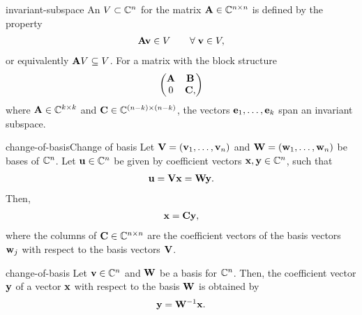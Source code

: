 \begin{Definition}{invariant-subspace}
  An  $V\subset\mathbb C^n$ for the matrix
  $\mathbf A\in\mathbb C^{n\times n}$ is defined by the property
  \begin{gather}
    \mathbf A\mathbf v \in V \qquad \forall\;\mathbf v\in V,
  \end{gather}
  or equivalently $\mathbf A V \subseteq V$.
  For a matrix with the block structure
  \begin{gather}
    \begin{pmatrix}
      \mathbf A & \mathbf B\\ 0 & \mathbf C,
    \end{pmatrix}
  \end{gather}
  where $\mathbf A\in\mathbb C^{k\times k}$ and $\mathbf C\in\mathbb C^{(n-k)\times (n-k)}$,
  the vectors $\mathbf e_{1},\dots,\mathbf e_{k}$ span an invariant subspace.
\end{Definition}

\begin{Lemma*}{change-of-basis}{Change of basis}
  Let $\mathbf V = (\mathbf v_1,\dots, \mathbf v_n)$ and $\mathbf W = (\mathbf w_1,\dots, \mathbf w_n)$ be
  bases of $\mathbb C^n$. Let $\mathbf u\in \mathbb C^n$ be given by coefficient vectors
  $\mathbf x,\mathbf y\in \mathbb C^n$, such that
  \begin{gather}
    \mathbf u = \mathbf V\mathbf x = \mathbf W\mathbf y.
  \end{gather}
  Then,
  \begin{gather}
    \mathbf x = \mathbf C \mathbf y,
  \end{gather}
  where the columns of $\mathbf C\in \mathbb C^{n\times n}$ are the coefficient
  vectors of the basis vectors $\mathbf w_j$ with respect to the basis
  vectors $\mathbf V$.
\end{Lemma*}

\begin{Corollary}{change-of-basis}
  Let $\mathbf v\in \mathbb C^n$ and $\mathbf W$ be a basis for $\mathbb C^n$. Then, the
  coefficient vector $\mathbf y$ of a vector $\mathbf x$ with respect to the
  basis $\mathbf W$ is obtained by
  \begin{gather}
    \mathbf y = \mathbf W^{-1} \mathbf x.
  \end{gather}
\end{Corollary}

